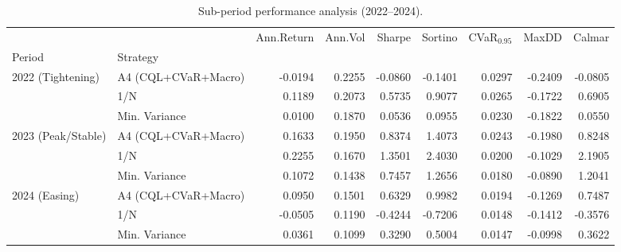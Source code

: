 \begin{table}
\caption{Sub-period performance analysis (2022--2024).}
\label{tab:subperiod_results}
\begin{tabular}{llrrrrrrr}
\toprule
 &  & Ann.Return & Ann.Vol & Sharpe & Sortino & CVaR$_{0.95}$ & MaxDD & Calmar \\
Period & Strategy &  &  &  &  &  &  &  \\
\midrule
\multirow[t]{3}{*}{2022 (Tightening)} & A4 (CQL+CVaR+Macro) & -0.0194 & 0.2255 & -0.0860 & -0.1401 & 0.0297 & -0.2409 & -0.0805 \\
 & 1/N & 0.1189 & 0.2073 & 0.5735 & 0.9077 & 0.0265 & -0.1722 & 0.6905 \\
 & Min. Variance & 0.0100 & 0.1870 & 0.0536 & 0.0955 & 0.0230 & -0.1822 & 0.0550 \\
\cline{1-9}
\multirow[t]{3}{*}{2023 (Peak/Stable)} & A4 (CQL+CVaR+Macro) & 0.1633 & 0.1950 & 0.8374 & 1.4073 & 0.0243 & -0.1980 & 0.8248 \\
 & 1/N & 0.2255 & 0.1670 & 1.3501 & 2.4030 & 0.0200 & -0.1029 & 2.1905 \\
 & Min. Variance & 0.1072 & 0.1438 & 0.7457 & 1.2656 & 0.0180 & -0.0890 & 1.2041 \\
\cline{1-9}
\multirow[t]{3}{*}{2024 (Easing)} & A4 (CQL+CVaR+Macro) & 0.0950 & 0.1501 & 0.6329 & 0.9982 & 0.0194 & -0.1269 & 0.7487 \\
 & 1/N & -0.0505 & 0.1190 & -0.4244 & -0.7206 & 0.0148 & -0.1412 & -0.3576 \\
 & Min. Variance & 0.0361 & 0.1099 & 0.3290 & 0.5004 & 0.0147 & -0.0998 & 0.3622 \\
\cline{1-9}
\bottomrule
\end{tabular}
\end{table}
